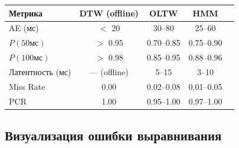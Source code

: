\documentclass[a4paper,11pt]{article}
\begin{document}
\begin{center}
\begin{tabular}{lcccc}
\toprule
\textbf{Метрика} & \textbf{DTW (offline)} & \textbf{OLTW} & \textbf{HMM} \\
\midrule
AE (мс)         & $<$ 20   & 30--80  & 25--60  \\
$P(50\text{мс})$ & $>$ 0.95 & 0.70--0.85 & 0.75--0.90 \\
$P(100\text{мс})$ & $>$ 0.98 & 0.85--0.95 & 0.88--0.96 \\
Латентность (мс) & --- (offline) & 5--15 & 3--10 \\
Miss Rate        & 0.00     & 0.02--0.08 & 0.01--0.05 \\
PCR              & 1.00     & 0.95--1.00 & 0.97--1.00 \\
\bottomrule
\end{tabular}
\label{tab:metrics_comparison}
\end{center}

\subsection{Визуализация ошибки выравнивания}
\end{document}

